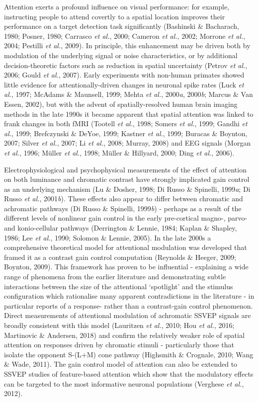 \documentclass[
  letterpaper,
  DIV=11,
  numbers=noendperiod]{scrartcl}
\begin{document}
Attention exerts a profound influence on visual performance: for
example, instructing people to attend covertly to a spatial location
improves their performance on a target detection task significantly
(Bashinski \& Bacharach, 1980; Posner, 1980; Carrasco \emph{et al.},
2000; Cameron \emph{et al.}, 2002; Morrone \emph{et al.}, 2004; Pestilli
\emph{et al.}, 2009). In principle, this enhancement may be driven both
by modulation of the underlying signal or noise characteristics, or by
additional decision-theoretic factors such as reduction in spatial
uncertainty (Petrov \emph{et al.}, 2006; Gould \emph{et al.}, 2007).
Early experiments with non-human primates showed little evidence for
attentionally-driven changes in neuronal spike rates (Luck \emph{et
al.}, 1997; McAdams \& Maunsell, 1999; Mehta \emph{et al.},
2000\emph{a}, 2000\emph{b}; Marcus \& Van Essen, 2002), but with the
advent of spatially-resolved human brain imaging methods in the late
1990s it became apparent that spatial attention was linked to frank
changes in both fMRI (Tootell \emph{et al.}, 1998; Somers \emph{et al.},
1999; Gandhi \emph{et al.}, 1999; Brefczynski \& DeYoe, 1999; Kastner
\emph{et al.}, 1999; Buracas \& Boynton, 2007; Silver \emph{et al.},
2007; Li \emph{et al.}, 2008; Murray, 2008) and EEG signals (Morgan
\emph{et al.}, 1996; Müller \emph{et al.}, 1998; Müller \& Hillyard,
2000; Ding \emph{et al.}, 2006).

Electrophysiological and psychophysical measurements of the effect of
attention on both luminance and chromatic contrast have strongly
implicated gain control as an underlying mechanism (Lu \& Dosher, 1998;
Di Russo \& Spinelli, 1999\emph{a}; Di Russo \emph{et al.},
2001\emph{b}). These effects also appear to differ between chromatic and
achromatic pathways (Di Russo \& Spinelli, 1999\emph{b}) - perhaps as a
result of the different levels of nonlinear gain control in the early
pre-cortical magno-, parvo- and konio-cellular pathways (Derrington \&
Lennie, 1984; Kaplan \& Shapley, 1986; Lee \emph{et al.}, 1990; Solomon
\& Lennie, 2005). In the late 2000s a comprehensive theoretical model
for attentional modulation was developed that framed it as a contrast
gain control computation (Reynolds \& Heeger, 2009; Boynton, 2009). This
framework has proven to be influential - explaining a wide range of
phenomena from the earlier literature and demonstrating subtle
interactions between the size of the attentional `spotlight' and the
stimulus configuration which rationalise many apparent contradictions in
the literature - in particular reports of a response- rather than a
contrast-gain control phenomenon. Direct measurements of attentional
modulation of achromatic SSVEP signals are broadly consistent with this
model (Lauritzen \emph{et al.}, 2010; Hou \emph{et al.}, 2016;
Martinovic \& Andersen, 2018) and confirm the relatively weaker role of
spatial attention on responses driven by chromatic stimuli -
particularly those that isolate the opponent S-(L+M) cone pathway
(Highsmith \& Crognale, 2010; Wang \& Wade, 2011). The gain control
model of attention can also be extended to SSVEP studies of
feature-based attention which show that the modulatory effects can be
targeted to the most informative neuronal populations (Verghese \emph{et
al.}, 2012).
\end{document}

